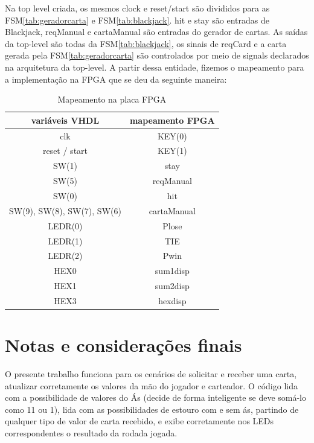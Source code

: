 \documentclass[oneside]{uffstex}
\begin{document}
Na top level criada, os mesmos clock e reset/start são divididos para as FSM\ref{tab:geradorcarta} e FSM\ref{tab:blackjack}. hit e stay são entradas de Blackjack, reqManual e cartaManual são entradas do gerador de cartas. As saídas da top-level são todas da FSM\ref{tab:blackjack}, os sinais de reqCard e a carta gerada pela FSM\ref{tab:geradorcarta} são controlados por meio de signals declarados na arquitetura da top-level. A partir dessa entidade, fizemos o mapeamento para a implementação na FPGA que se deu da seguinte maneira: 

\begin{table}[H]
    \centering
    \begin{tabular}{|c|c|}
    \hline
        variáveis VHDL & mapeamento FPGA \\
        \hline        
        clk & KEY(0) \\
        \hline
        reset / start & KEY(1) \\
        \hline
        SW(1) & stay \\
        \hline 
        SW(5) & reqManual \\
        \hline
        SW(0) & hit \\
        \hline
        SW(9), SW(8), SW(7), SW(6) & cartaManual \\
        \hline
        LEDR(0) & Plose \\
        \hline
        LEDR(1) & TIE \\
        \hline
        LEDR(2) & Pwin \\
        \hline
        HEX0 & sum1disp\\
        \hline
        HEX1 & sum2disp\\
        \hline
        HEX3 & hexdisp\\
        \hline
    \end{tabular}
    \caption{Mapeamento na placa FPGA}
    \label{tab:mapeamento}
\end{table}



\chapter{Notas e considerações finais}
O presente trabalho funciona para os cenários de solicitar e receber uma carta, atualizar corretamente os valores da mão do jogador e carteador. O código lida com a possibilidade de valores do Ás (decide de forma inteligente se deve somá-lo como 11 ou 1), lida com as possibilidades de estouro com e sem ás, partindo de qualquer tipo de valor de carta recebido, e exibe corretamente nos LEDs correspondentes o resultado da rodada jogada.
\end{document}
